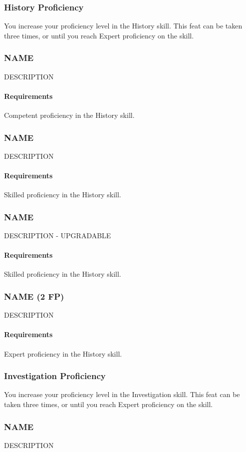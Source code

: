 \subsubsection{History Proficiency} \label{feat::historyprof}
    You increase your proficiency level in the History skill.
    This feat can be taken three times, or until you reach Expert proficiency on the skill.
\subsubsection{NAME} \label{feat::name}
    DESCRIPTION
    \paragraph{Requirements} Competent proficiency in the History skill.
\subsubsection{NAME} \label{feat::name}
    DESCRIPTION
    \paragraph{Requirements} Skilled proficiency in the History skill.
\subsubsection{NAME} \label{feat::name}
    DESCRIPTION - UPGRADABLE
    \paragraph{Requirements} Skilled proficiency in the History skill.
\subsubsection{NAME (2 FP)} \label{feat::name}
    DESCRIPTION
    \paragraph{Requirements} Expert proficiency in the History skill.
\subsubsection{Investigation Proficiency} \label{feat::investigationprof}
    You increase your proficiency level in the Investigation skill.
    This feat can be taken three times, or until you reach Expert proficiency on the skill.
\subsubsection{NAME} \label{feat::name}
    DESCRIPTION
